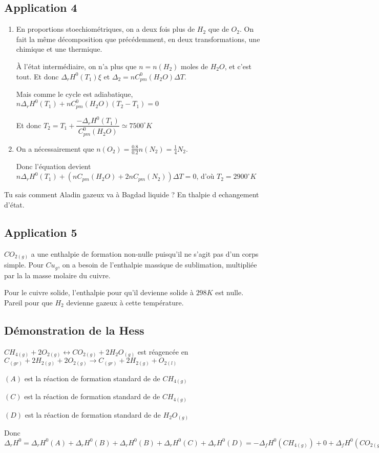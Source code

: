 \documentclass[a4paper,12pt]{book}
\begin{document}
\subsection{Application 4}
\begin{enumerate}
\item En proportions stoechiométriques, on a deux fois plus de $H_2$ que de $O_2$. On fait la même décomposition que précédemment, en deux transformations, une chimique et une thermique.
\par À l'état intermédiaire, on n'a plus que $n=n(H_2)$ moles de $H_2O$, et c'est tout. Et donc $\Delta_rH^0(T_1)\xi$ et $\Delta_2=nC_{pm}^0(H_2O)\Delta T$. \par Mais comme le cycle est adiabatique, $n\Delta_rH^0(T_1)+nC_{pm}^0(H_2O)(T_2-T_1)=0$
\par Et donc $T_2 =T_1+\dfrac{-\Delta_rH^0(T_1)}{C_{pm}^0(H_2O)}\simeq 7500^\circ K$
\item On a nécessairement que $n(O_2)=\frac{0.8}{0.2}n(N_2)=\frac{1}{4}N_2$. \par Donc l'équation devient $n\Delta_rH^0(T_1) +\left(nC_{pm}(H_2O) +2nC_{pm}(N_2)\right)\Delta T =0$, d'où $T_2=2900^\circ K$ 
\end{enumerate}

Tu sais comment Aladin gazeux va à Bagdad liquide ? En thalpie d echangement d'état.
\subsection{Application 5}
$CO_{2(g)}$ a une enthalpie de formation non-nulle puisqu'il ne s'agit pas d'un corps simple. Pour $Cu_{g}$, on a besoin de l'enthalpie massique de sublimation, multipliée par la la masse molaire du cuivre.
\par Pour le cuivre solide, l'enthalpie pour qu'il devienne solide à $298K$ est nulle. Pareil pour que $H_2$ devienne gazeux à cette température.

\subsection{Démonstration de la Hess}
$CH_{4(g)} + 2O_{2(g)}\leftrightarrow CO_{2(g)}+2H_2O_{(g)}$ est réagencée en $C_{(gr)}+2H_{2(g)}+2O_{2(g)}\rightarrow C_{(gr)}+2H_{2(g)} +O_{2(l)}$
\par $(A)$ est la réaction de formation standard de de $CH_{4(g)}$ \par $(C)$ est la réaction de formation standard de de $CH_{4(g)}$ \par $(D)$ est la réaction de formation standard de de $H_2O_{(g)}$
\par Donc $\Delta_rH^0=\Delta_rH^0(A)+\Delta_rH^0(B)+\Delta_rH^0(B)+\Delta_rH^0(C)+\Delta_rH^0(D)=-\Delta_fH^0(CH_{4(g)})+0+\Delta_fH^0(CO_{2(g)})+2\Delta_fH^0(H_2O_{(g)})$
\end{document}
